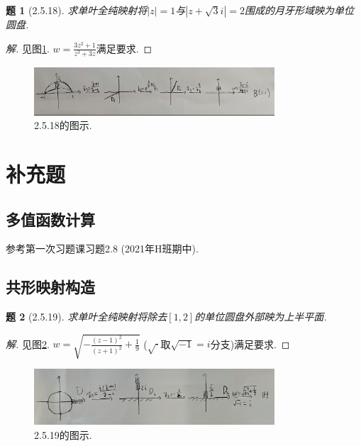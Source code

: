 \documentclass{article}[a4paper, 12pt]
\newtheorem{problem}{题}
\newenvironment{solution}{\begin{proof}[解]}{\end{proof}}
\begin{document}
\begin{problem}[2.5.18]
  求单叶全纯映射将\(|z|=1\)与\(|z+\sqrt{3}i|=2\)围成的月牙形域映为单位圆盘.
\end{problem}

\begin{solution}
  见图\ref{fig:2.5.18}. \(w=\frac{3z^2+1}{z^3+3z}\)满足要求.
\end{solution}

\begin{figure}[htbp]
  \centering
  \includegraphics[width=0.8\textwidth]{images/2.5.18.jpg}
  \caption{2.5.18的图示.}
  \label{fig:2.5.18}
\end{figure}

\section{补充题}

\subsection{多值函数计算}

参考第一次习题课习题2.8 (2021年H班期中).

\subsection{共形映射构造}

\begin{problem}[2.5.19]
  求单叶全纯映射将除去\([1,2]\)的单位圆盘外部映为上半平面.
\end{problem}

\begin{solution}
  见图\ref{fig:2.5.19}. \(w=\sqrt{-\frac{(z-1)^2}{(z+1)^2}+\frac19}\) (\(\sqrt{\cdot}\)取\(\sqrt{-1}=i\)分支)满足要求.
\end{solution}

\begin{figure}[htbp]
  \centering
  \includegraphics[width=0.8\textwidth]{images/2.5.19.jpg}
  \caption{2.5.19的图示.}
  \label{fig:2.5.19}
\end{figure}
\end{document}
